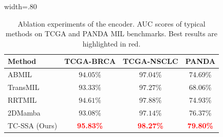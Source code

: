 \documentclass[runningheads]{llncs}
\begin{document}
\begin{table}[ht]
\centering
\caption{Ablation experiments of the encoder. AUC scores of typical methods on TCGA and PANDA MIL benchmarks. Best results are highlighted in red.}
\label{tab:tcga_mil_auc}
\begin{adjustbox}{width=.80\textwidth}{
    \begin{tabular}{lccc}
    \toprule
    \textbf{Method} & \textbf{TCGA-BRCA} & \textbf{TCGA-NSCLC} &\textbf{PANDA}\\
    \midrule
    ABMIL\citep{Ilse2018Attentionbased} & $94.05\%$ & $97.04\%$ & 74.69\%\\
    TransMIL\citep{Shao2021TransMIL} & $93.33\%$ & $97.27\%$ & 68.06\%\\
    RRTMIL\citep{Tang2024Feature} & $94.61\%$ & $97.88\%$ & 74.93\%\\
    2DMamba\citep{Zhang2024DMamba} & $93.08\%$ & $97.14\%$ & 76.37\%\\
    TC-SSA (Ours) & \textcolor{red}{\textbf{95.83\%}} & \textcolor{red}{\textbf{98.27\%}} & \textcolor{red}{\textbf{79.80\%}}\\
    \bottomrule
    \end{tabular}
}\end{adjustbox}
\end{table}


\end{document}
